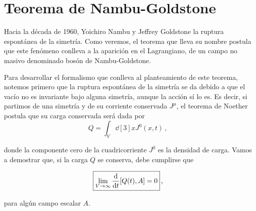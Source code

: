 \section{Teorema de Nambu-Goldstone}

Hacia la década de 1960, Yoichiro Nambu y Jeffrey Goldstone la ruptura espontánea de la simetría. Como veremos, el teorema que lleva su nombre postula que este fenómeno conlleva a la aparición en el Lagrangiano, de un campo no masivo denominado bosón de Nambu-Goldstone.

Para desarrollar el formalismo que conlleva al planteamiento de este teorema, notemos primero que la ruptura espontánea de la simetría se da debido a que el vacío no es invariante bajo alguna simetría, aunque la acción sí lo es. Es decir, si partimos de una simetría y de su corriente conservada $J^\mu$, el teorema de Noether postula que su carga conservada será dada por
%
\begin{equation}
    Q = \int_V \dd[3]{x} J^0(x, t) \,,
\end{equation}

\noindent donde la componente cero de la cuadricorriente $J^0$ es la densidad de carga. Vamos a demostrar que, si la carga $Q$ se conserva, debe cumplirse que

\begin{equation}
    \boxed{\lim_{V \rightarrow \infty} \dv{t} \comm{Q(t)}{A} = 0} \,,
\end{equation}

\noindent para algún campo escalar $A$.

